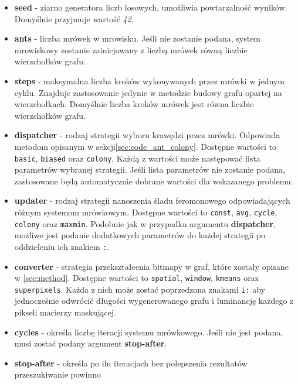 {{{            \begin{itemize}
                \item \textbf{seed} - ziarno generatora liczb losowych, umożliwia powtarzalność wyników. Domyślnie
                przyjmuje wartość \textit{42}.
                \item \textbf{ants} - liczba mrówek w mrowisku. Jeśli nie zostanie podana, system mrowiskowy zostanie
                zainicjowany z liczbą mrówek równą liczbie wierzchołków grafu.
                \item \textbf{steps} - maksymalna liczba kroków wykonywanych przez mrówki w jednym cyklu. Znajduje
                zastosowanie jedynie w metodzie budowy grafu opartej na wierzchołkach. Domyślnie liczba kroków mrówek
                jest równa liczbie wierzchołków grafu.
                \item \textbf{dispatcher} - rodzaj strategii wyboru krawędzi przez mrówki. Odpowiada metodom opisanym w
                sekcji\ref{sec:code_ant_colony}. Dostępne wartości to \lstinline{basic}, \lstinline{biased} oraz
                \lstinline{colony}. Każdą z wartości może następować lista parametrów wybranej strategii. Jeśli lista
                parametrów nie zostanie podana, zastosowane będą automatycznie dobrane wartości dla wskazanego problemu.
                \item \textbf{updater} - rodzaj strategii nanoszenia śladu feromonowego odpowiadających różnym systemom
                mrówkowym. Dostępne wartości to \lstinline{const}, \lstinline{avg}, \lstinline{cycle},
                \lstinline{colony} oraz \lstinline{maxmin}. Podobnie jak w przypadku argumentu \textbf{dispatcher},
                możliwe jest podanie dodatkowych parametrów do każdej strategii po oddzieleniu ich znakiem
                \lstinline{:}.
                \item \textbf{converter} - strategia przekształcenia bitmapy w graf, które zostały opisane w
                \ref{sec:method}. Dostępne wartości to \lstinline{spatial}, \lstinline{window}, \lstinline{kmeans} oraz
                \lstinline{superpixels}. Każda z nich może zostać poprzedzona znakami \lstinline{i:} aby jednocześnie
                odwrócić długości wygenerowanego grafu i luminancję każdego z pikseli macierzy maskującej.
                \item \textbf{cycles} - określa liczbę iteracji systemu mrówkowego. Jeśli nie jest podana, musi zostać
                podany argument \textbf{stop-after}.
                \item \textbf{stop-after} - określa po ilu iteracjach bez polepszenia rezultatów przeszukiwanie powinno

\end{itemize}}}}
